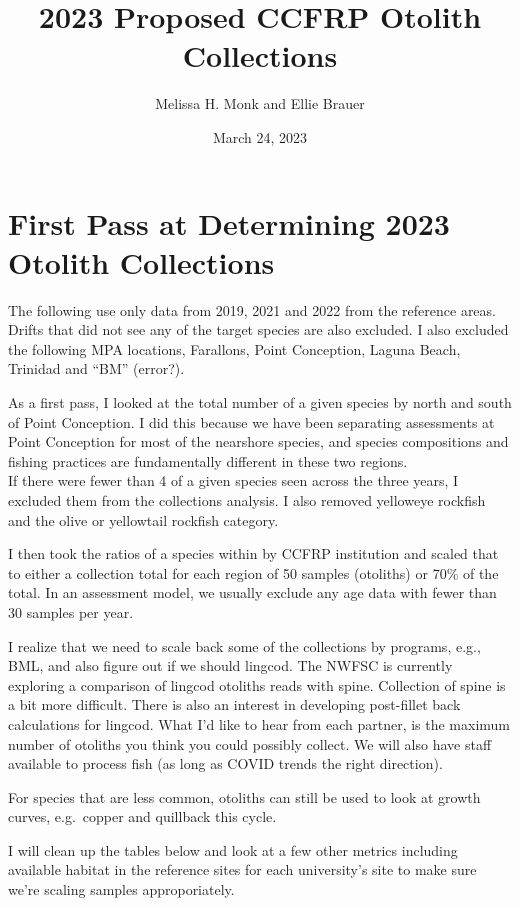 \documentclass[
]{article}
\title{2023 Proposed CCFRP Otolith Collections}
\author{Melissa H. Monk and Ellie Brauer}
\date{March 24, 2023}
\begin{document}
\maketitle

\hypertarget{first-pass-at-determining-2023-otolith-collections}{%
\section{First Pass at Determining 2023 Otolith Collections}\label{first-pass-at-determining-2023-otolith-collections}}

The following use only data from 2019, 2021 and 2022 from the reference areas. Drifts that did not see any of the target species are also excluded. I also excluded the following MPA locations, Farallons, Point Conception, Laguna Beach, Trinidad and ``BM'' (error?).

As a first pass, I looked at the total number of a given species by north and south
of Point Conception. I did this because we have been separating assessments at
Point Conception for most of the nearshore species, and species compositions and
fishing practices are fundamentally different in these two regions.\\
If there were fewer than 4 of a given species seen across the three years, I
excluded them from the collections analysis. I also removed yelloweye rockfish
and the olive or yellowtail rockfish category.

I then took the ratios of a
species within by CCFRP institution and scaled that to either a collection total
for each region of 50 samples (otoliths) or 70\% of the total. In an assessment model,
we usually exclude any age data with fewer than 30 samples per year.

I realize that we need to scale back some of the collections by programs, e.g., BML,
and also figure out if we should lingcod. The NWFSC is currently exploring
a comparison of lingcod otoliths reads with spine. Collection of spine is a bit more
difficult. There is also an interest in developing post-fillet back calculations
for lingcod. What I'd like to hear from each partner, is the maximum number of
otoliths you think you could possibly collect. We will also have staff available
to process fish (as long as COVID trends the right direction).

For species that are less common, otoliths can still be used to look at growth
curves, e.g.~copper and quillback this cycle.

I will clean up the tables below and look at a few other metrics including
available habitat in the reference sites for each university's site to make sure
we're scaling samples approporiately.
\end{document}
